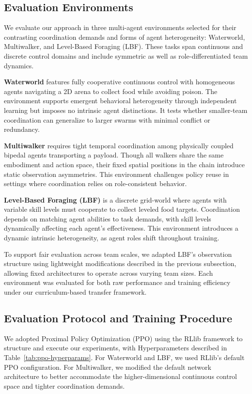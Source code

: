 \documentclass{article}
\begin{document}
\subsection{Evaluation Environments} 

We evaluate our approach in three multi-agent environments selected for their contrasting 
coordination demands and forms of agent heterogeneity: 
Waterworld, Multiwalker, and Level-Based Foraging (LBF). These tasks span continuous 
and discrete control domains and include symmetric as well as role-differentiated team dynamics.

\textbf{Waterworld} features fully cooperative continuous control with homogeneous agents 
navigating a 2D arena to collect food while avoiding poison. The environment supports emergent 
behavioral heterogeneity through independent learning but imposes no intrinsic agent distinctions. 
It tests whether smaller-team coordination can generalize to larger swarms with minimal 
conflict or redundancy.

\textbf{Multiwalker} requires tight temporal coordination among physically coupled bipedal agents 
transporting a payload. Though all walkers share the same embodiment and action space, 
their fixed spatial positions in the chain introduce static observation asymmetries. 
This environment challenges policy reuse in settings where coordination relies on 
role-consistent behavior.

\textbf{Level-Based Foraging (LBF)} is a discrete grid-world where agents with variable skill 
levels must cooperate to collect leveled food targets. Coordination depends on matching agent 
abilities to task demands, with skill levels dynamically affecting each agent's effectiveness. 
This environment introduces a dynamic intrinsic heterogeneity, as agent roles shift throughout 
training.

To support fair evaluation across team scales, we adapted LBF's observation structure using 
lightweight modifications described in the previous subsection, allowing fixed 
architectures to operate across varying team sizes. Each environment was evaluated for both 
raw performance and training efficiency under our curriculum-based transfer framework.

\subsection{Evaluation Protocol and Training Procedure}

We adopted Proximal Policy Optimization (PPO)\cite{schulman2017} using the RLlib 
framework to structure and execute our experiments, with Hyperparameters described in
Table~\ref{tab:ppo-hyperparams}. For Waterworld and LBF, 
we used RLlib's default PPO configuration. For Multiwalker, we modified the default 
network architecture to better accommodate the higher-dimensional continuous control space and 
tighter coordination demands.
\end{document}

